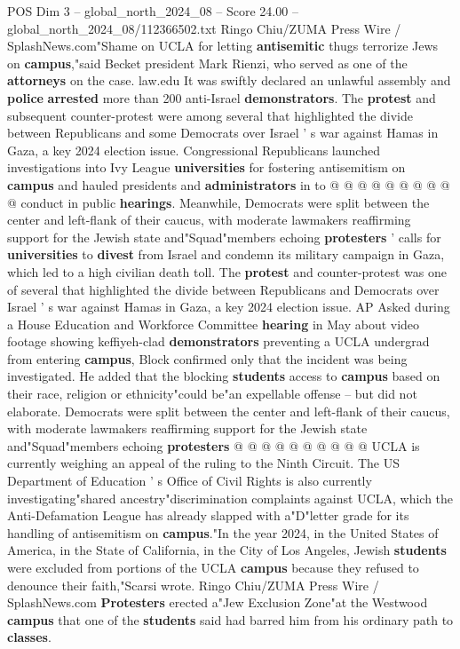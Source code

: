 \begin{textsample}{POS Dim 3 – global\_north\_2024\_08 – Score 24.00 – global\_north\_2024\_08/112366502.txt}
Ringo Chiu/ZUMA Press Wire / SplashNews.com"Shame on UCLA for letting \textbf{antisemitic} thugs terrorize Jews on \textbf{campus},"said Becket president Mark Rienzi, who served as one of the \textbf{attorneys} on the case. law.edu It was swiftly declared an unlawful assembly and \textbf{police} \textbf{arrested} more than 200 anti-Israel \textbf{demonstrators}.
The \textbf{protest} and subsequent counter-protest were among several that highlighted the divide between Republicans and some Democrats over Israel ' s war against Hamas in Gaza, a key 2024 election issue.
Congressional Republicans launched investigations into Ivy League \textbf{universities} for fostering antisemitism on \textbf{campus} and hauled presidents and \textbf{administrators} in to @ @ @ @ @ @ @ @ @ @ conduct in public \textbf{hearings}.
Meanwhile, Democrats were split between the center and left-flank of their caucus, with moderate lawmakers reaffirming support for the Jewish state and"Squad"members echoing \textbf{protesters} ' calls for \textbf{universities} to \textbf{divest} from Israel and condemn its military campaign in Gaza, which led to a high civilian death toll.
The \textbf{protest} and counter-protest was one of several that highlighted the divide between Republicans and Democrats over Israel ' s war against Hamas in Gaza, a key 2024 election issue.
AP Asked during a House Education and Workforce Committee \textbf{hearing} in May about video footage showing keffiyeh-clad \textbf{demonstrators} preventing a UCLA undergrad from entering \textbf{campus}, Block confirmed only that the incident was being investigated.
He added that the blocking \textbf{students} access to \textbf{campus} based on their race, religion or ethnicity"could be"an expellable offense -- but did not elaborate.
Democrats were split between the center and left-flank of their caucus, with moderate lawmakers reaffirming support for the Jewish state and"Squad"members echoing \textbf{protesters} @ @ @ @ @ @ @ @ @ @ UCLA is currently weighing an appeal of the ruling to the Ninth Circuit.
The US Department of Education ' s Office of Civil Rights is also currently investigating"shared ancestry"discrimination complaints against UCLA, which the Anti-Defamation League has already slapped with a"D"letter grade for its handling of antisemitism on \textbf{campus}."In the year 2024, in the United States of America, in the State of California, in the City of Los Angeles, Jewish \textbf{students} were excluded from portions of the UCLA \textbf{campus} because they refused to denounce their faith,"Scarsi wrote.
Ringo Chiu/ZUMA Press Wire / SplashNews.com \textbf{Protesters} erected a"Jew Exclusion Zone"at the Westwood \textbf{campus} that one of the \textbf{students} said had barred him from his ordinary path to \textbf{classes}.

\end{textsample}
